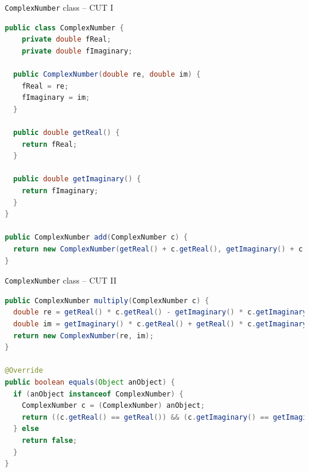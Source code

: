 \documentclass[11pt, xcolor=svgnames]{beamer}
\begin{document}


\begin{frame}[fragile]{\texttt{ComplexNumber} class -- CUT I}


\begin{lstlisting}[language=Java,basicstyle=\scriptsize]
public class ComplexNumber {
    private double fReal;
    private double fImaginary;

  public ComplexNumber(double re, double im) {
    fReal = re;
    fImaginary = im;
  }

  public double getReal() {
    return fReal;
  }

  public double getImaginary() {
    return fImaginary;
  }
}

public ComplexNumber add(ComplexNumber c) {
  return new ComplexNumber(getReal() + c.getReal(), getImaginary() + c.getImaginary());
}
\end{lstlisting}

\end{frame}


\begin{frame}[fragile]{\texttt{ComplexNumber} class -- CUT II}

\begin{lstlisting}[language=Java,basicstyle=\scriptsize]
public ComplexNumber multiply(ComplexNumber c) {
  double re = getReal() * c.getReal() - getImaginary() * c.getImaginary();
  double im = getImaginary() * c.getReal() + getReal() * c.getImaginary();
  return new ComplexNumber(re, im);
}

@Override
public boolean equals(Object anObject) {
  if (anObject instanceof ComplexNumber) {
    ComplexNumber c = (ComplexNumber) anObject;
    return ((c.getReal() == getReal()) && (c.getImaginary() == getImaginary()));
  } else
    return false;
  }
}
\end{lstlisting}

\end{frame}



\end{document}
